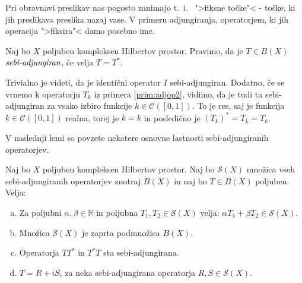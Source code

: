 \documentclass[mat2]{matdelo}
\newcommand{\R}{\mathbb{R}}
\newcommand{\pojem}[1]{\ensuremath{\emph{#1}}}
\begin{document}
			Pri obravnavi preslikav nas pogosto zanimajo t.~i.~ ">fiksne točke"< - točke, ki jih preslikava preslika nazaj vase. V primeru adjungiranja, operatorjem, ki jih operacija ">fiksira"< damo posebno ime.
			
			\begin{definicija}
				\label{def:sebiadjop}
				Naj bo $X$ poljuben kompleksen Hilbertov prostor. Pravimo, da je $T\in B(X)$ \pojem{sebi-adjungiran}, če velja $T = T^*$.
			\end{definicija}
			
			\begin{primer}
				\label{prim:sebiadjop}
				Trivialno je videti, da je identični operator $I$ sebi-adjungiran. Dodatno, če se vrnemo k operatorju $T_k$ iz primera \ref{prim:adjop2}, vidimo, da je tudi ta sebi-adjungiran za vsako izbiro funkcije $k\in\mathcal{C}([0, 1])$. To je res, saj je funkcija $k\in\mathcal{C}([0, 1])$ realna, torej je $\overline{k} = k$ in posledično je $(T_k)^* = T_{\overline{k}} = T_k$.
				
			\end{primer}
			
			V naslednji lemi so povzete nekatere osnovne lastnosti sebi-adjungiranih operatorjev.
			
			\begin{lema}
				\label{lem:sebiadjlast}
				Naj bo $X$ poljuben kompleksen Hilbertov prostor. Naj bo $\mathcal{S}(X)$ množica vseh sebi-adjungiranih operatorjev znotraj $B(X)$ in naj bo $T\in B(X)$ poljuben. Velja:
				\begin{enumerate}[a)]
					\item Za poljubni $\alpha, \beta \in \R$ in poljubna $T_1, T_2 \in \mathcal{S}(X)$ velja: $\alpha T_1 + \beta T_2 \in \mathcal{S}(X)$.
					\item Množica $\mathcal{S}(X)$ je zaprta podmnožica $B(X)$.
					\item Operatorja $TT^*$ in $T^*T$ sta sebi-adjungirana.
					\item $T = R + iS$, za neka sebi-adjungirana operatorja $R, S \in \mathcal{S}(X)$.
				\end{enumerate}
			\end{lema}
			
\end{document}
